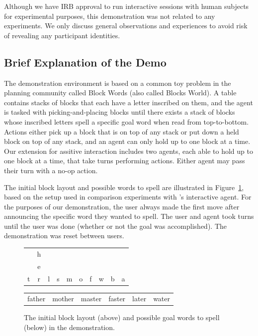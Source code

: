 \documentclass[letterpaper]{article} %
\begin{document}
Although we have IRB approval to run interactive sessions with human subjects for experimental purposes, this demonstration was not related to any experiments. %
 We %
 only discuss general observations and experiences to avoid risk of revealing any participant identities.

\subsection{Brief Explanation of the Demo\label{sec:challenges.demo}}
The demonstration environment is based on a common toy problem in the planning community called Block Words (also called Blocks World).  A table contains stacks of blocks that each have a letter inscribed on them, and the agent is tasked with picking-and-placing blocks until there exists a stack of blocks whose inscribed letters spell a specific goal word when read from top-to-bottom.  Actions either pick up a block that is on top of any stack or put down a held block on top of any stack, and an agent can only hold up to one block at a time.  Our extension for assitive interaction includes two agents, each able to hold up to one block at a time, that take turns performing actions.  Either agent may pass their turn with a no-op action.

The initial block layout and possible words to spell are illustrated in Figure~\ref{fig:blockwordsDemo}, based on the setup %
 used in comparison experiments with \citeauthor{thesis_levine}'s  interactive agent. %
 For the purposes of our demonstration, the user always made the first move after announcing the specific word they wanted to spell. %
 The user and agent took turns until the user was done (whether or not the goal was accomplished).  The demonstration was reset between users. %

\begin{figure}
\centering
\begin{tabular}{cccccccccc}
& h & & & & & & & &  \\
& e & & & & & & & &  \\
t & r & l & s & m & o & f & w & b & a \\
\hline
\end{tabular}
\begin{tabular}{cccccc}
father & mother & master & faster & later & water \\
\end{tabular}
\caption{The initial block layout (above) and possible goal words to spell (below) in the demonstration.\label{fig:blockwordsDemo}}
\end{figure}
\end{document}
